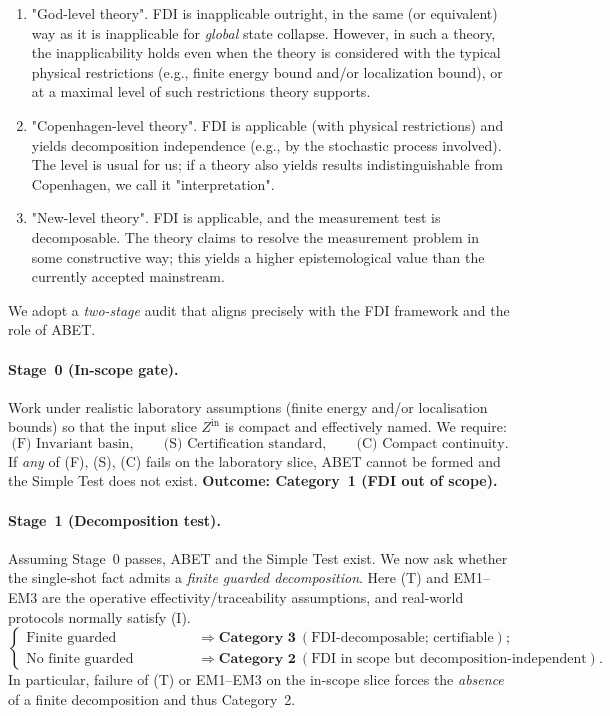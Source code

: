\documentclass[12pt]{article}
\theoremstyle{definition}
\theoremstyle{plain}
\begin{document}
\begin{enumerate}[label={Category (\arabic*)}]
    \item "God-level theory". FDI is inapplicable outright, in the same (or equivalent) way as it is inapplicable for \emph{global} state collapse. However, in such a theory, the inapplicability holds even when the theory is considered with the typical physical restrictions (e.g., finite energy bound and/or localization bound), or at a maximal level of such restrictions theory supports.
    \item "Copenhagen-level theory". FDI is applicable (with physical restrictions) and yields decomposition independence (e.g., by the stochastic process involved). The level is usual for us; if a theory also yields results indistinguishable from Copenhagen, we call it "interpretation".
    \item "New-level theory". FDI is applicable, and the measurement test is decomposable. The theory claims to resolve the measurement problem in some constructive way; this yields a higher epistemological value than the currently accepted mainstream.
\end{enumerate}

We adopt a \emph{two-stage} audit that aligns precisely with the FDI framework and the role of ABET.

\paragraph{Stage~0 (In-scope gate).}
Work under realistic laboratory assumptions (finite energy and/or localisation bounds) so that the input slice $Z^{\mathrm{in}}$ is compact and effectively named. We require:
\[
\text{(F) Invariant basin},\qquad
\text{(S) Certification standard},\qquad
\text{(C) Compact continuity}.
\]
If \emph{any} of (F), (S), (C) fails on the laboratory slice, ABET cannot be formed and the Simple Test does not exist. \textbf{Outcome: Category~1 (FDI out of scope).}

\paragraph{Stage~1 (Decomposition test).}
Assuming Stage~0 passes, ABET and the Simple Test exist. We now ask whether the single-shot fact admits a \emph{finite guarded decomposition}. Here (T) and EM1–EM3 are the operative effectivity/traceability assumptions, and real-world protocols normally satisfy (I).
\[
\begin{cases}
\text{Finite guarded decomposition exists} &\Rightarrow \textbf{Category~3} \ (\text{FDI-decomposable; certifiable});\\[2pt]
\text{No finite guarded decomposition} &\Rightarrow \textbf{Category~2} \ (\text{FDI in scope but decomposition-independent}).
\end{cases}
\]
\noindent
In particular, failure of (T) or EM1–EM3 on the in-scope slice forces the \emph{absence} of a finite decomposition and thus Category~2.
\end{document}
